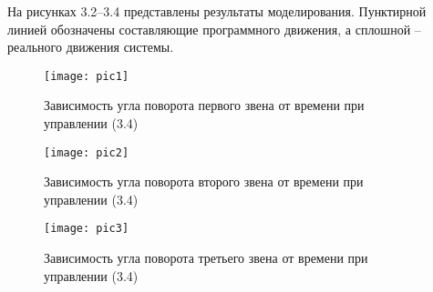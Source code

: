  На рисунках 3.2–3.4 представлены результаты моделирования. Пунктирной линией обозначены  составляющие программного движения, а сплошной – реального движения системы.
 
 
  \begin{figure}[h]
  	\centering
  	\texttt{[image: pic1]}
  	\caption{Зависимость угла поворота первого звена от времени при управлении (3.4) }
  	\label{fig:manip2}
  \end{figure}
  
  \begin{figure}[h]
    	\centering
    	\texttt{[image: pic2]}
    	\caption{Зависимость угла поворота второго звена от времени при управлении (3.4)  }
    	\label{fig:manip2}
    \end{figure}
    
      \begin{figure}[h]
      	\centering
      	\texttt{[image: pic3]}
      	\caption{Зависимость угла поворота третьего звена от времени при управлении (3.4) }
      	\label{fig:manip2}
      \end{figure}